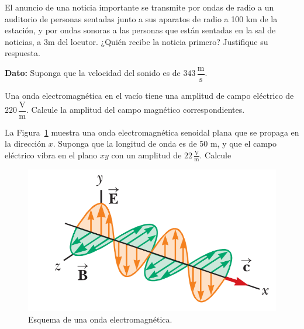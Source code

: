 \documentclass[addpoints]{exam}
\begin{document}
\begin{questions}
    \question El anuncio de una noticia importante se transmite por ondas de radio a un auditorio de personas sentadas junto a sus aparatos de radio a 100 km de la estación, y por ondas sonoras a las personas que están sentadas en la sal de noticias, a 3m del locutor. ¿Quién recibe la noticia primero? Justifique su respuesta.

    \textbf{Dato:} Suponga que la velocidad del sonido es de $343 \, \dfrac{\text{m}}{\text{s}}$.

    \question Una onda electromagnética en el vacío tiene una amplitud de campo eléctrico de $220 \, \dfrac{\text{V}}{\text{m}}$. Calcule la amplitud del campo magnético correspondientes.

    \question La Figura~\ref{fig:ondaEM} muestra una onda electromagnética senoidal plana que se propaga en la dirección $x$. Suponga que la longitud de onda es de 50 m, y que el campo eléctrico vibra en el plano $xy$ con un amplitud de $22 \, \frac{\text{V}}{\text{m}}$. Calcule

    \begin{figure}[ht]
        \centering
        \includegraphics[scale=0.4]{ondaEM.png}
        \caption[Onda electromagnética]{Esquema de una onda electromagnética.}
        \label{fig:ondaEM}
    \end{figure}


\end{questions}
\end{document}
